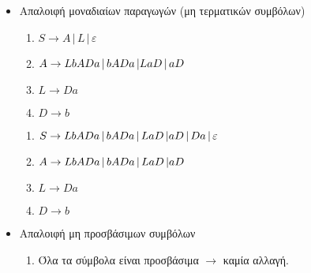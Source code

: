 \begin{tcolorbox}[colback=yellow!15!white, colframe=blue!50!white,
	fonttitle=\bfseries\Large, title = Μετατροπή $CFG\rightarrow CNF$ 1/3]
\begin{itemize}
\begin{minipage}[t]{0.5\textwidth}
\begin{enumerate}
				\item $L\rightarrow Da$

				\item $D\rightarrow b$
			\end{enumerate}
		\end{minipage}

	\bigskip \medskip
	\item Απαλοιφή μοναδιαίων παραγωγών (μη τερματικών συμβόλων)
	\reducevspace\reducevspace\reducevspace\reducevspace\reducevspace\reducevspace\reducevspace

	\begin{minipage}[t]{0.5\textwidth}
			\begin{enumerate}

				\item $S\rightarrow Α \,|\, L \,|\, \varepsilon$

				\item $A\rightarrow LbADa \,|\, bADa \,|\\
									LaD \,|\, aD$

				\item $L\rightarrow Da$

				\item $D\rightarrow b$
			\end{enumerate}
	\end{minipage}%
	\hfill
	\begin{minipage}[t]{0.5\textwidth}
		\begin{enumerate}



			\item $S\rightarrow LbADa \,|\, bADa \,|\, LaD \,|\\
								aD \,|\, Da \,|\, \varepsilon$

			\item $A\rightarrow LbADa \,|\, bADa \,|\, LaD \,|\\
					 			aD$

			\item $L\rightarrow Da$

			\item $D\rightarrow b$
		\end{enumerate}
	\end{minipage}

	\bigskip \medskip
	\item Απαλοιφή μη προσβάσιμων συμβόλων
	\reducevspace\reducevspace\reducevspace\reducevspace\reducevspace\reducevspace\reducevspace
		\begin{enumerate}
			\item Όλα τα σύμβολα είναι προσβάσιμα $\rightarrow$ καμία αλλαγή.
		\end{enumerate}



\end{itemize}

\end{tcolorbox}


